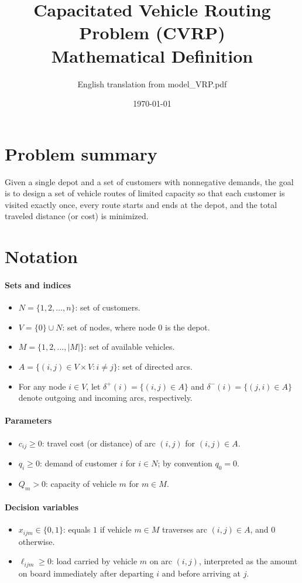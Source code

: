 \documentclass[11pt,a4paper]{article}
\title{Capacitated Vehicle Routing Problem (CVRP)\\Mathematical Definition}
\author{English translation from model\_VRP.pdf}
\date{\today}
\begin{document}
\maketitle

\section*{Problem summary}
Given a single depot and a set of customers with nonnegative demands, the goal is to design a set of vehicle routes of limited capacity so that each customer is visited exactly once, every route starts and ends at the depot, and the total traveled distance (or cost) is minimized.

\section*{Notation}
\paragraph{Sets and indices}
\begin{itemize}
  \item $N = \{1,2,\dots,n\}$: set of customers.
  \item $V = \{0\} \cup N$: set of nodes, where node $0$ is the depot.
  \item $M = \{1,2,\dots,|M|\}$: set of available vehicles.
  \item $A = \{(i,j) \in V \times V : i \neq j\}$: set of directed arcs.
  \item For any node $i \in V$, let $\delta^+(i) = \{(i,j) \in A\}$ and $\delta^-(i) = \{(j,i) \in A\}$ denote outgoing and incoming arcs, respectively.
\end{itemize}

\paragraph{Parameters}
\begin{itemize}
  \item $c_{ij} \ge 0$: travel cost (or distance) of arc $(i,j)$ for $(i,j)\in A$.
  \item $q_i \ge 0$: demand of customer $i$ for $i \in N$; by convention $q_0 = 0$.
  \item $Q_m > 0$: capacity of vehicle $m$ for $m \in M$.
\end{itemize}

\paragraph{Decision variables}
\begin{itemize}
  \item $x_{ijm} \in \{0,1\}$: equals $1$ if vehicle $m \in M$ traverses arc $(i,j) \in A$, and $0$ otherwise.
  \item $\ell_{ijm} \ge 0$: load carried by vehicle $m$ on arc $(i,j)$, interpreted as the amount on board immediately after departing $i$ and before arriving at $j$.
\end{itemize}
\end{document}
